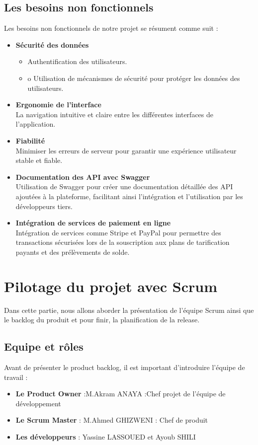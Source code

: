     \subsection{Les besoins non fonctionnels }
    Les besoins non fonctionnels de notre projet se résument comme suit : 
    \begin{itemize}
        \item \textbf{Sécurité des données }
        \begin{itemize}
            \item Authentification des utilisateurs.
            \item o	Utilisation de mécanismes de sécurité pour protéger les données des utilisateurs.
        \end{itemize}
        \item \textbf{Ergonomie de l'interface }\\
        La navigation intuitive et claire entre les différentes interfaces de l'application.
        \item \textbf{Fiabilité  }\\
        Minimiser les erreurs de serveur pour garantir une expérience utilisateur stable et fiable.
        \item \textbf{Documentation des API avec Swagger  }\\
        Utilisation de Swagger pour créer une documentation détaillée des API ajoutées à la plateforme, facilitant ainsi l'intégration et l'utilisation par les développeurs tiers.
        \item \textbf{Intégration de services de paiement en ligne }\\
        Intégration de services comme Stripe et PayPal pour permettre des transactions sécurisées lors de la souscription aux plans de tarification payants et des prélèvements de solde.
    \end{itemize}        

\section{Pilotage du projet avec Scrum }
Dans cette partie, nous allons aborder la présentation de l'équipe Scrum ainsi que le backlog du produit et pour finir, la planification de la release.
    \subsection{Equipe et rôles  } 
    Avant de présenter le product backlog, il est important d'introduire l'équipe de travail :
    \begin{itemize}
        \item \textbf{Le Product Owner }:M.Akram ANAYA :Chef projet de l’équipe de développement 
        \item \textbf{Le Scrum Master }: M.Ahmed GHIZWENI : Chef de produit
        \item \textbf{Les développeurs  }: Yassine LASSOUED et Ayoub SHILI
    \end{itemize} 
